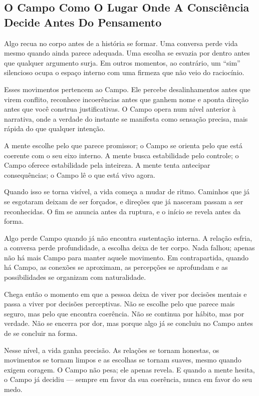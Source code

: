 \documentclass[12pt]{book}
\begin{document}
\subsection*{O Campo Como O Lugar Onde A Consciência Decide Antes Do Pensamento}

Algo recua no corpo antes de a história se formar. Uma conversa perde vida mesmo quando ainda parece adequada. Uma escolha se esvazia por dentro antes que qualquer argumento surja. Em outros momentos, ao contrário, um ``sim'' silencioso ocupa o espaço interno com uma firmeza que não veio do raciocínio.

Esses movimentos pertencem ao Campo. Ele percebe desalinhamentos antes que virem conflito, reconhece incoerências antes que ganhem nome e aponta direção antes que você construa justificativas. O Campo opera num nível anterior à narrativa, onde a verdade do instante se manifesta como sensação precisa, mais rápida do que qualquer intenção.

A mente escolhe pelo que parece promissor; o Campo se orienta pelo que está coerente com o seu eixo interno. A mente busca estabilidade pelo controle; o Campo oferece estabilidade pela inteireza. A mente tenta antecipar consequências; o Campo lê o que está vivo agora.

Quando isso se torna visível, a vida começa a mudar de ritmo. Caminhos que já se esgotaram deixam de ser forçados, e direções que já nasceram passam a ser reconhecidas. O fim se anuncia antes da ruptura, e o início se revela antes da forma.

Algo perde Campo quando já não encontra sustentação interna. A relação esfria, a conversa perde profundidade, a escolha deixa de ter corpo. Nada falhou; apenas não há mais Campo para manter aquele movimento. Em contrapartida, quando há Campo, as conexões se aproximam, as percepções se aprofundam e as possibilidades se organizam com naturalidade.

Chega então o momento em que a pessoa deixa de viver por decisões mentais e passa a viver por decisões perceptivas. Não se escolhe pelo que parece mais seguro, mas pelo que encontra coerência. Não se continua por hábito, mas por verdade. Não se encerra por dor, mas porque algo já se concluiu no Campo antes de se concluir na forma.

Nesse nível, a vida ganha precisão. As relações se tornam honestas, os movimentos se tornam limpos e as escolhas se tornam suaves, mesmo quando exigem coragem. O Campo não pesa; ele apenas revela. E quando a mente hesita, o Campo já decidiu --- sempre em favor da sua coerência, nunca em favor do seu medo.
\end{document}
